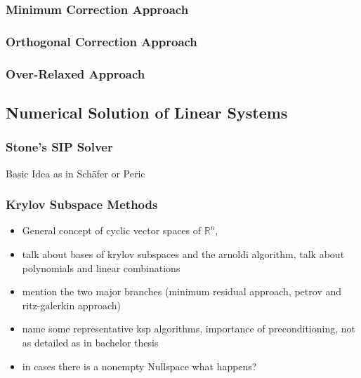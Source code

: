      \subsubsection{Minimum Correction Approach}
      \subsubsection{Orthogonal Correction Approach}
      \subsubsection{Over-Relaxed Approach}

    \subsection{Numerical Solution of Linear Systems}
       \subsubsection{Stone's SIP Solver}
         Basic Idea as in Schäfer or Peric
       \subsubsection{Krylov Subspace Methods}
        \begin{itemize}
          \item General concept of cyclic vector spaces of \(\mathbb{R}^n\), 
          \item talk about bases of krylov subspaces and the arnoldi algorithm, talk about polynomials and linear combinations
          \item mention the two major branches (minimum residual approach, petrov and ritz-galerkin approach) 
          \item name some representative ksp algorithms, importance of preconditioning, not as detailed as in bachelor thesis
          \item in cases there is a nonempty Nullspace what happens?
        \end{itemize}

